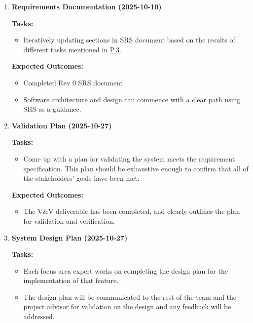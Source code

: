 \documentclass[12pt]{article}
\theoremstyle{definition}
\begin{document}
\begin{enumerate}
  \vspace{0.8em}

  \item \textbf{Requirements Documentation (2025-10-10)}  

  \textbf{Tasks:}
  \begin{itemize}
      \item Iteratively updating sections in SRS document based on the results 
      of different tasks mentioned in \hyperref[item: p3]{P.3}. 
  \end{itemize}

  \textbf{Expected Outcomes:}
  \begin{itemize}
      \item Completed Rev 0 SRS document
      \item Software architecture and design can commence with a clear path 
      using SRS as a guidance. 
  \end{itemize}

  \vspace{0.8em}

  \item \textbf{Validation Plan (2025-10-27)}  

  \textbf{Tasks:}
  \begin{itemize}
      \item Come up with a plan for validating the system meets the requirement 
      specification.
      This plan should be exhaustive enough to confirm that all of the
      stakeholders' goals have been met. 
  \end{itemize}

  \textbf{Expected Outcomes:}
  \begin{itemize}
      \item The V\&V deliverable has been completed, and clearly outlines the 
      plan for validation and verification. 
  \end{itemize}

  \vspace{0.8em}

  \item \textbf{System Design Plan (2025-10-27)}  

  \textbf{Tasks:}
  \begin{itemize}
      \item Each focus area expert works on completing the design plan for the 
      implementation of that feature. 
      \item The design plan will be communicated to the rest of the team and the
       project advisor for validation on the design
      and any feedback will be addressed. 
  \end{itemize}


\end{enumerate}
\end{document}
